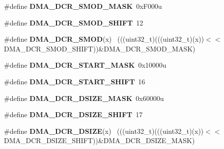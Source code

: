 \begin{DoxyCompactItemize}
\item 
\hypertarget{group___d_m_a___register___masks_gac1240160400703410f467f172117850f}{}\#define {\bfseries D\+M\+A\+\_\+\+D\+C\+R\+\_\+\+S\+M\+O\+D\+\_\+\+M\+A\+S\+K}~0x\+F000u\label{group___d_m_a___register___masks_gac1240160400703410f467f172117850f}

\item 
\hypertarget{group___d_m_a___register___masks_ga72bcd718d03993e1f6faaef56f87c317}{}\#define {\bfseries D\+M\+A\+\_\+\+D\+C\+R\+\_\+\+S\+M\+O\+D\+\_\+\+S\+H\+I\+F\+T}~12\label{group___d_m_a___register___masks_ga72bcd718d03993e1f6faaef56f87c317}

\item 
\hypertarget{group___d_m_a___register___masks_ga4423f692a5b6931199917e454cf235d9}{}\#define {\bfseries D\+M\+A\+\_\+\+D\+C\+R\+\_\+\+S\+M\+O\+D}(x)                                                ~(((uint32\+\_\+t)(((uint32\+\_\+t)(x))$<$$<$D\+M\+A\+\_\+\+D\+C\+R\+\_\+\+S\+M\+O\+D\+\_\+\+S\+H\+I\+F\+T))\&D\+M\+A\+\_\+\+D\+C\+R\+\_\+\+S\+M\+O\+D\+\_\+\+M\+A\+S\+K)\label{group___d_m_a___register___masks_ga4423f692a5b6931199917e454cf235d9}

\item 
\hypertarget{group___d_m_a___register___masks_gaaaca42eb6474221a4e91f687194fafd6}{}\#define {\bfseries D\+M\+A\+\_\+\+D\+C\+R\+\_\+\+S\+T\+A\+R\+T\+\_\+\+M\+A\+S\+K}~0x10000u\label{group___d_m_a___register___masks_gaaaca42eb6474221a4e91f687194fafd6}

\item 
\hypertarget{group___d_m_a___register___masks_ga86b820fe50e65e5c67d14ba4d3d36c6c}{}\#define {\bfseries D\+M\+A\+\_\+\+D\+C\+R\+\_\+\+S\+T\+A\+R\+T\+\_\+\+S\+H\+I\+F\+T}~16\label{group___d_m_a___register___masks_ga86b820fe50e65e5c67d14ba4d3d36c6c}

\item 
\hypertarget{group___d_m_a___register___masks_ga2b7bfbe2aea8f1b41a42795ff78c4fd5}{}\#define {\bfseries D\+M\+A\+\_\+\+D\+C\+R\+\_\+\+D\+S\+I\+Z\+E\+\_\+\+M\+A\+S\+K}~0x60000u\label{group___d_m_a___register___masks_ga2b7bfbe2aea8f1b41a42795ff78c4fd5}

\item 
\hypertarget{group___d_m_a___register___masks_ga6b04b13ff50c5d9247f9a12dd582d511}{}\#define {\bfseries D\+M\+A\+\_\+\+D\+C\+R\+\_\+\+D\+S\+I\+Z\+E\+\_\+\+S\+H\+I\+F\+T}~17\label{group___d_m_a___register___masks_ga6b04b13ff50c5d9247f9a12dd582d511}

\item 
\hypertarget{group___d_m_a___register___masks_ga8ea97512489369cbc809561e27932a06}{}\#define {\bfseries D\+M\+A\+\_\+\+D\+C\+R\+\_\+\+D\+S\+I\+Z\+E}(x)                                              ~(((uint32\+\_\+t)(((uint32\+\_\+t)(x))$<$$<$D\+M\+A\+\_\+\+D\+C\+R\+\_\+\+D\+S\+I\+Z\+E\+\_\+\+S\+H\+I\+F\+T))\&D\+M\+A\+\_\+\+D\+C\+R\+\_\+\+D\+S\+I\+Z\+E\+\_\+\+M\+A\+S\+K)\label{group___d_m_a___register___masks_ga8ea97512489369cbc809561e27932a06}


\end{DoxyCompactItemize}
